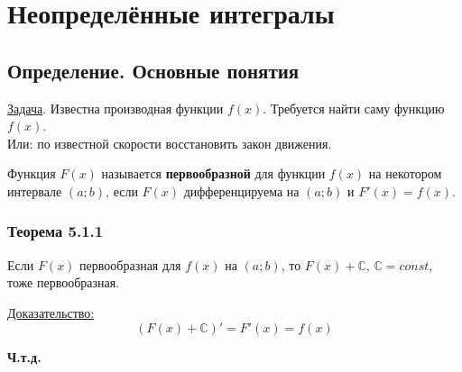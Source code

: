 \documentclass[12pt]{article}
\begin{document}
    \section{Неопределённые интегралы}
    \subsection{Определение. Основные понятия}\noindent
    \underline{Задача}. Известна производная функции $f(x)$. Требуется найти саму функцию $f(x)$.\\
    Или: по известной скорости восстановить закон движения.\par\noindent
    Функция $F(x)$ называется \textbf{первообразной} для функции $f(x)$ на некотором интервале $(a; b)$, если $F(x)$ дифференцируема на $(a; b)$ и $F'(x) = f(x)$.
    \subsubsection*{Теорема 5.1.1}\label{th:5.1.1}
    Если $F(x)$ первообразная для $f(x)$ на $(a; b)$, то $F(x) + \mathbb{C}$, $\mathbb{C} = const$, тоже первообразная.\par\noindent
    \underline{Доказательство:}
    \[ (F(x) + \mathbb{C})' = F'(x) = f(x) \]
    \begin{center}
        \textbf{Ч.т.д.}
    \end{center}
\end{document}
